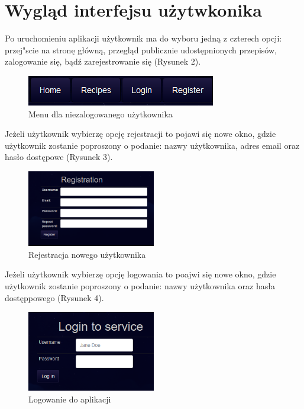 \documentclass{article}
\begin{document}
\section{Wygląd interfejsu użytwkonika}
Po uruchomieniu aplikacji użytkownik ma do wyboru jedną z czterech opcji: przej"scie na stronę główną, przegląd publicznie udostępnionych przepisów, zalogowanie się, bądź zarejestrowanie się (Rysunek 2).
\begin{figure}[!ht]
  \centering
    \includegraphics[]{reshp1}\par\vspace{1cm}
  \caption{Menu dla niezalogowanego użytkownika}
\end{figure}

Jeżeli użytkownik wybierzę opcję rejestracji to pojawi się nowe okno, gdzie użytkownik zostanie poproszony o podanie: nazwy użytkownika, adres email oraz hasło dostępowe (Rysunek 3).
\begin{figure}[!ht]
  \centering
    \includegraphics[width=0.5\textwidth]{reshp2}\par\vspace{1cm}
  \caption{Rejestracja nowego użytkownika}
\end{figure}

Jeżeli użytkownik wybierzę opcję logowania to poajwi się nowe okno, gdzie użytkownik zostanie poproszony o podanie: nazwy użytkownika oraz hasła dostęppowego (Rysunek 4).
\begin{figure}[!ht]
  \centering
    \includegraphics[width=0.5\textwidth]{reshp3}\par\vspace{1cm}
  \caption{Logowanie do aplikacji}
\end{figure}
\end{document}
